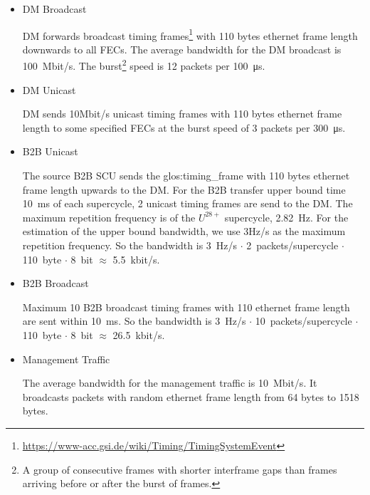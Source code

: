 \begin{itemize}
    \item DM Broadcast 

DM forwards broadcast timing frames\footnote{\url{https://www-acc.gsi.de/wiki/Timing/TimingSystemEvent}} with 110 bytes ethernet frame length downwards to all FECs. The average bandwidth for the DM broadcast is \SI{100}{Mbit/s}. The burst\footnote{A group of consecutive frames with shorter interframe gaps than frames arriving before or after the burst of frames.} speed is 12 packets per \SI{100}{\micro\second}.
 		\item DM Unicast 

DM sends 10Mbit/s unicast timing frames with 110 bytes ethernet frame length to some specified FECs at the burst speed of 3 packets per \SI{300}{\micro\second}.
	\item B2B Unicast

The source B2B SCU sends the \gls{glos:timing_frame} with 110 bytes ethernet frame length upwards to the DM. For the B2B transfer upper bound time \SI{10}{\ms} of each supercycle, 2 unicast timing frames are send to the DM. The maximum repetition frequency is of the $U^{28+}$ supercycle, \SI{2.82}{\Hz}. For the estimation of the upper bound bandwidth, we use 3Hz/s as the maximum repetition frequency.  So the bandwidth is \SI{3}{\Hz/\second} $\cdot$ \SI{2}{packets/supercycle} $\cdot$ \SI{110}{byte} $\cdot$ \SI{8}{bit} $\approx$ \SI{5.5}{kbit/s}. 
	\item B2B Broadcast

Maximum 10 B2B broadcast timing frames with 110 ethernet frame length are sent within \SI{10}{\ms}. So the bandwidth is \SI{3}{\Hz/\second} $\cdot$ \SI{10}{packets/supercycle} $\cdot$ \SI{110}{byte} $\cdot$ \SI{8}{bit} $\approx$ \SI{26.5}{kbit/s}.

	\item Management Traffic

The average bandwidth for the management traffic is \SI{10}{Mbit/s}. It broadcasts packets with random ethernet frame length from 64 bytes to 1518 bytes. 
\end{itemize}

